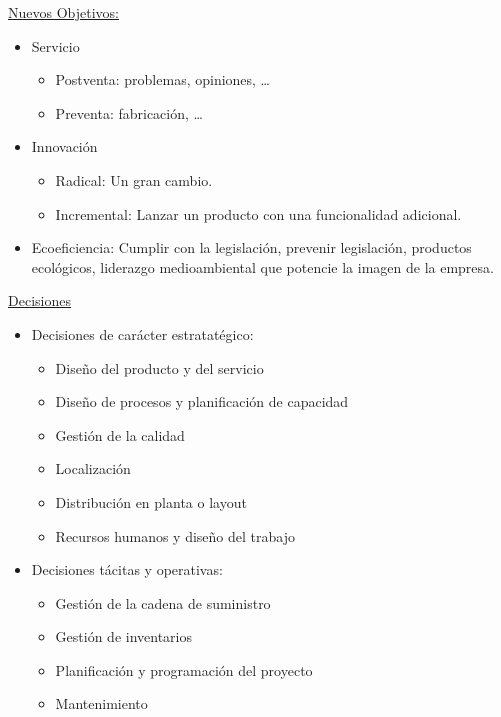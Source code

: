 \documentclass[12pt]{report} %
\providecommand{\tightlist}{%
  \setlength{\itemsep}{0pt}\setlength{\parskip}{0pt}}
\begin{document}
\underline{Nuevos Objetivos:}

\begin{itemize}
\tightlist
\item
  Servicio

  \begin{itemize}
  \tightlist
  \item
    Postventa: problemas, opiniones, \ldots{}
  \item
    Preventa: fabricación, \ldots{}
  \end{itemize}
\item
  Innovación

  \begin{itemize}
  \tightlist
  \item
    Radical: Un gran cambio.
  \item
    Incremental: Lanzar un producto con una funcionalidad adicional.
  \end{itemize}
\item
  Ecoeficiencia: Cumplir con la legislación, prevenir legislación,
  productos ecológicos, liderazgo medioambiental que potencie la imagen
  de la empresa.
\end{itemize}

\underline{Decisiones}

\begin{itemize}
\tightlist
\item
  Decisiones de carácter estratatégico:

  \begin{itemize}
  \tightlist
  \item
    Diseño del producto y del servicio\\
  \item
    Diseño de procesos y planificación de capacidad\\
  \item
    Gestión de la calidad\\
  \item
    Localización\\
  \item
    Distribución en planta o layout\\
  \item
    Recursos humanos y diseño del trabajo\\
  \end{itemize}
\item
  Decisiones tácitas y operativas:

  \begin{itemize}
  \tightlist
  \item
    Gestión de la cadena de suministro\\
  \item
    Gestión de inventarios\\
  \item
    Planificación y programación del proyecto\\
  \item
    Mantenimiento
  \end{itemize}
\end{itemize}
\end{document}
